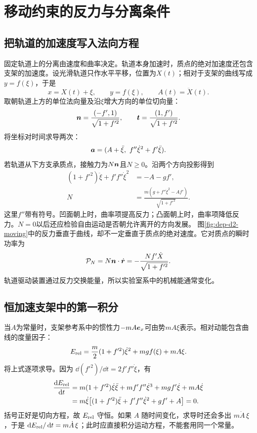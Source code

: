 \section{移动约束的反力与分离条件}
\subsection{把轨道的加速度写入法向方程}
固定轨道上的分离由速度和曲率决定。轨道本身加速时，质点的绝对加速度还包含支架的加速度。设光滑轨道只作水平平移，位置为$X(t)$；相对于支架的曲线写成$y=f(\xi)$，于是
\[
 x=X(t)+\xi,\qquad y=f(\xi),\qquad A(t)=\ddot X(t).
\]
取朝轨道上方的单位法向量及沿$\xi$增大方向的单位切向量：
\[
 \bm{n}=\frac{(-f',1)}{\sqrt{1+f'^2}},\qquad
 \bm{t}=\frac{(1,f')}{\sqrt{1+f'^2}}.
\]
将坐标对时间求导两次：
\[
 \vct a=(A+\ddot\xi,\ f''\dot\xi^2+f'\ddot\xi).
\]
若轨道从下方支承质点，接触力为$N\bm{n}$且$N\geq0$。沿两个方向投影得到
\begin{align}
 (1+f'^2)\ddot\xi+f'f''\dot\xi^2&=-A-gf',\\
 N&=\frac{m(g+f''\dot\xi^2-Af')}{\sqrt{1+f'^2}}.
\end{align}
这里$f''$带有符号。凹面朝上时，曲率项提高反力；凸面朝上时，曲率项降低反力。$N=0$以后还应检验自由运动是否朝允许离开的方向发展。
图\ref{fig:dep-d2-moving}中的反力垂直于曲线，却不一定垂直于质点的绝对速度。它对质点的瞬时功率为
\[
 \mathcal P_N=N\bm{n}\cdot\dot{\bm{r}}
 =-\frac{Nf'\dot X}{\sqrt{1+f'^2}}.
\]
轨道驱动装置通过反力交换能量，所以实验室系中的机械能通常变化。

\subsection{恒加速支架中的第一积分}
当$A$为常量时，支架参考系中的惯性力$-mA\bm{e}_x$可由势$mA\xi$表示。相对动能包含曲线的度量因子：
\[
 E_{\rm rel}=\frac m2(1+f'^2)\dot\xi^2+mgf(\xi)+mA\xi.
\]
将上式逐项求导。因为 $\dd(f'^2)/\dd t=2f'f''\dot\xi$，有
\[
\begin{aligned}
\frac{\mathop{}\!\mathrm d E_{\rm rel}}{\mathop{}\!\mathrm d t}
&=m(1+f'^2)\dot\xi\ddot\xi+mf'f''\dot\xi^3
+mgf'\dot\xi+mA\dot\xi\\
&=m\dot\xi\big[(1+f'^2)\ddot\xi+f'f''\dot\xi^2+gf'+A\big]=0.
\end{aligned}
\]
括号正好是切向方程，故 $E_{\rm rel}$ 守恒。如果 $A$ 随时间变化，求导时还会多出 $m\dot A\,\xi$，于是 $\mathop{}\!\mathrm d E_{\rm rel}/\mathop{}\!\mathrm d t=m\dot A\,\xi$；此时应直接积分运动方程，不能套用同一个常量。

